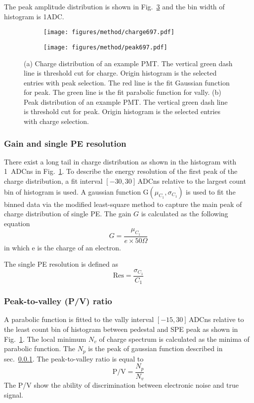 The peak amplitude distribution is shown in Fig.~\ref{fig:peak} and the bin width of histogram is 1ADC.
\begin{figure}[!htbp]
    \centering
    \begin{subfigure}[t]{0.49\textwidth}
        \texttt{[image: figures/method/charge697.pdf]}
        \caption{}%
        \label{fig:charge}
    \end{subfigure}
    \begin{subfigure}[t]{0.49\textwidth}
        \texttt{[image: figures/method/peak697.pdf]}
        \caption{}%
        \label{fig:peak}
    \end{subfigure}
    \caption{(a) Charge distribution of an example PMT. The vertical green dash line is threshold cut for charge. Origin histogram is the selected entries with peak selection. The red line is the fit Gaussian function for peak. The green line is the fit parabolic function for vally. (b) Peak distribution of an example PMT. The vertical green dash line is threshold cut for peak. Origin histogram is the selected entries with charge selection.}
\end{figure}
\subsubsection{Gain and single PE resolution}
\label{sec:noisegain}
There exist a long tail in charge distribution as shown in the histogram with \SI{1}{ADCns} in Fig.~\ref{fig:charge}. To describe the energy resolution of the first peak of the charge distribution, a fit interval $[-30, 30]$\,ADCns relative to the largest count bin of histogram is used. A gaussian function G$(\mu_{C_1},\sigma_{C_1})$ is used to fit the binned data via the modified least-square method to capture the main peak of charge distribution of single PE. The gain $G$ is calculated as the following equation
\begin{equation}
    G=\frac{\mu_{C_1}}{e\times 50\Omega}
\end{equation}
in which e is the charge of an electron.

The single PE resolution is defined as
\begin{equation}
    \mathrm{Res}=\frac{\sigma_{C_1}}{C_1}
\end{equation}
\subsubsection{Peak-to-valley (P/V) ratio}
A parabolic function is fitted to the vally interval $[-15, 30]$\,ADCns relative to the least count bin of histogram between pedestal and SPE peak as shown in Fig.~\ref{fig:charge}. The local minimum $N_v$ of charge spectrum is calculated as the minima of parabolic function. The $N_p$ is the peak of gaussian function described in sec.~\ref{sec:noisegain}. The peak-to-valley ratio is equal to  
\begin{equation}
    \mathrm{P/V}=\frac{N_p}{N_v}
\end{equation}
The P/V show the ability of discrimination between electronic noise and true signal.
